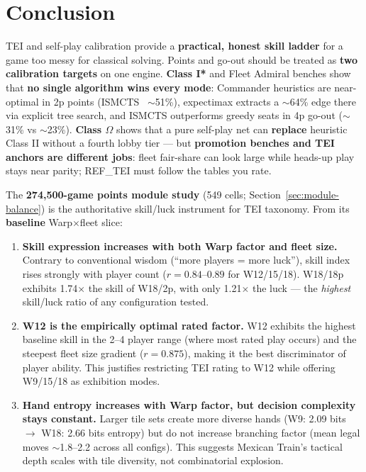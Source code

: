 \documentclass[11pt,letterpaper]{article}
\begin{document}
\section{Conclusion}

TEI and self-play calibration provide a \textbf{practical, honest skill ladder} for a game too messy for classical solving. Points and go-out should be treated as \textbf{two calibration targets} on one engine. \textbf{Class I*} and Fleet Admiral benches show that \textbf{no single algorithm wins every mode}: Commander heuristics are near-optimal in 2p points (ISMCTS~\cite{cowling2012ismcts} $\sim$51\%), expectimax extracts a $\sim$64\% edge there via explicit tree search, and ISMCTS outperforms greedy seats in 4p go-out ($\sim$31\% vs $\sim$23\%). \textbf{Class $\Omega$} shows that a pure self-play net can \textbf{replace} heuristic Class II without a fourth lobby tier --- but \textbf{promotion benches and TEI anchors are different jobs}: fleet fair-share can look large while heads-up play stays near parity; REF\_TEI must follow the tables you rate.

The \textbf{274{,}500-game points module study} (549 cells; Section~\ref{sec:module-balance}) is the authoritative skill/luck instrument for TEI taxonomy. From its \textbf{baseline} Warp$\times$fleet slice:

\begin{enumerate}
\item \textbf{Skill expression increases with both Warp factor and fleet size.} Contrary to conventional wisdom (``more players = more luck''), skill index rises strongly with player count ($r = 0.84$--$0.89$ for W12/15/18). W18/18p exhibits 1.74$\times$ the skill of W18/2p, with only 1.21$\times$ the luck --- the \textit{highest} skill/luck ratio of any configuration tested.

\item \textbf{W12 is the empirically optimal rated factor.} W12 exhibits the highest baseline skill in the 2--4 player range (where most rated play occurs) and the steepest fleet size gradient ($r = 0.875$), making it the best discriminator of player ability. This justifies restricting TEI rating to W12 while offering W9/15/18 as exhibition modes.

\item \textbf{Hand entropy increases with Warp factor, but decision complexity stays constant.} Larger tile sets create more diverse hands (W9: 2.09 bits $\to$ W18: 2.66 bits entropy) but do not increase branching factor (mean legal moves $\sim$1.8--2.2 across all configs). This suggests Mexican Train's tactical depth scales with tile diversity, not combinatorial explosion.
\end{enumerate}
\end{document}
